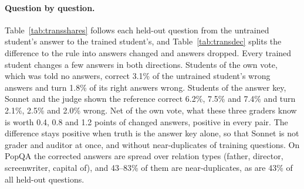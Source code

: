 \begin{table}[t]
\small
\centering
\setlength{\tabcolsep}{5pt}
\caption{Where a trained student's true reward differs from the vote rule applied to the untrained student. \emph{Changed}: wrong answers turned right minus right answers turned wrong. \emph{Dropped}: wrong answers dropped beyond the rule minus right answers dropped beyond the rule, half a point each. The total also contains 0.0--0.2 points from questions the untrained student left unanswered. Brackets: 95\% $t$ intervals with the student--dataset pairs as the sample; the intervals of the other columns are in the released output. Last two columns: the same difference with truth taken from the answer key alone, and without held-out questions that are near-duplicates of a training question.}
\label{tab:transdec}
\end{table}

\paragraph{Question by question.} Table~\ref{tab:transshares} follows each held-out question from the untrained student's answer to the trained student's, and Table~\ref{tab:transdec} splits the difference to the rule into answers changed and answers dropped. Every trained student changes a few answers in both directions. Students of the own vote, which was told no answers, correct 3.1\% of the untrained student's wrong answers and turn 1.8\% of its right answers wrong. Students of the answer key, Sonnet and the judge shown the reference correct 6.2\%, 7.5\% and 7.4\% and turn 2.1\%, 2.5\% and 2.0\% wrong. Net of the own vote, what these three graders know is worth 0.4, 0.8 and 1.2 points of changed answers, positive in every pair. The difference stays positive when truth is the answer key alone, so that Sonnet is not grader and auditor at once, and without near-duplicates of training questions. On PopQA the corrected answers are spread over relation types (father, director, screenwriter, capital of), and 43--83\% of them are near-duplicates, as are 43\% of all held-out questions.

